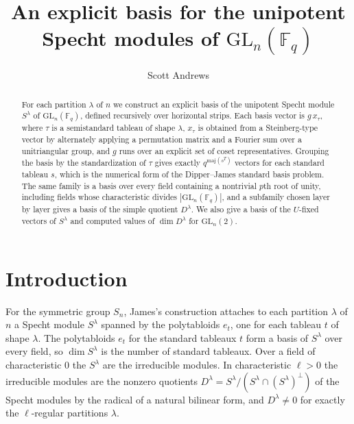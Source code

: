 \documentclass[11pt, letterpaper]{amsart}
\theoremstyle{definition}
\theoremstyle{remark}
\newcommand{\FF}{\mathbb{F}}
\newcommand{\GL}{\mathrm{GL}}
\newcommand{\maj}{\mathrm{maj}}
\begin{document}
\title{An explicit basis for the unipotent Specht modules of $\GL_n(\FF_q)$}
\author{Scott Andrews}
\address{Department of Mathematics \\ Boise State University \\ Boise, ID 83725}
\date{}
\begin{abstract}
For each partition $\lambda$ of $n$ we construct an explicit basis of the unipotent Specht module $S^\lambda$ of $\GL_n(\FF_q)$, defined recursively over horizontal strips. Each basis vector is $g\,x_\tau$, where $\tau$ is a semistandard tableau of shape $\lambda$, $x_\tau$ is obtained from a Steinberg-type vector by alternately applying a permutation matrix and a Fourier sum over a unitriangular group, and $g$ runs over an explicit set of coset representatives. Grouping the basis by the standardization of $\tau$ gives exactly $q^{\maj(s^T)}$ vectors for each standard tableau $s$, which is the numerical form of the Dipper--James standard basis problem. The same family is a basis over every field containing a nontrivial $p$th root of unity, including fields whose characteristic divides $|\GL_n(\FF_q)|$, and a subfamily chosen layer by layer gives a basis of the simple quotient $D^\lambda$. We also give a basis of the $U$-fixed vectors of $S^\lambda$ and computed values of $\dim D^\lambda$ for $\GL_n(2)$.
\end{abstract}
\maketitle

\section{Introduction}

For the symmetric group $S_n$, James's construction attaches to each partition $\lambda$ of $n$ a Specht module $S^\lambda$ spanned by the polytabloids $e_t$, one for each tableau $t$ of shape $\lambda$. The polytabloids $e_t$ for the standard tableaux $t$ form a basis of $S^\lambda$ over every field, so $\dim S^\lambda$ is the number of standard tableaux. Over a field of characteristic $0$ the $S^\lambda$ are the irreducible modules. In characteristic $\ell>0$ the irreducible modules are the nonzero quotients $D^\lambda=S^\lambda/(S^\lambda\cap(S^\lambda)^\perp)$ of the Specht modules by the radical of a natural bilinear form, and $D^\lambda\ne0$ for exactly the $\ell$-regular partitions $\lambda$.
\end{document}
